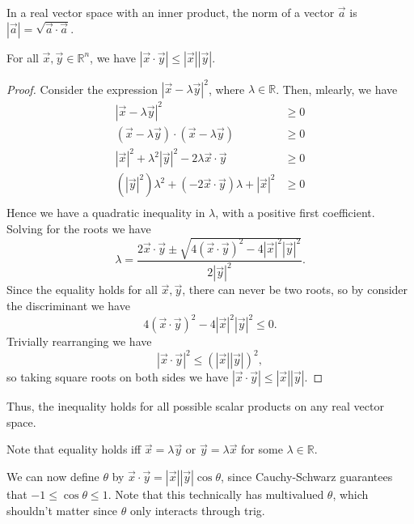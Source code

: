 \documentclass[12pt]{article}
\begin{document}
\begin{definition}
    In a real vector space with an inner product,
    the norm of a vector $\vec{a}$ is $|\vec{a}| = \sqrt{\vec{a}\cdot\vec{a}}$.
\end{definition}

\begin{theorem}
    For all $\vec{x},\vec{y} \in \mathbb{R}^{n}$, we have $|\vec{x}\cdot \vec{y}| \le |\vec{x}||\vec{y}|$.
    \begin{proof}
        Consider the expression $|\vec{x} - \lambda \vec{y}|^{2}$, where $\lambda \in \mathbb{R}$.
        Then, mlearly, we have
        \begin{align*}
            |\vec{x} - \lambda \vec{y}|^{2} &\ge 0 \\
            (\vec{x} - \lambda \vec{y})\cdot(\vec{x} - \lambda \vec{y}) &\ge 0\\
            |\vec{x}|^{2} + \lambda^{2}|\vec{y}|^{2} - 2\lambda \vec{x}\cdot\vec{y} &\ge 0\\
            (|\vec{y}|^{2})\lambda ^{2} + (-2\vec{x}\cdot\vec{y})\lambda + |\vec{x}|^{2} & \ge 0\\
        \end{align*}
        Hence we have a quadratic inequality in $\lambda $, with a positive first coefficient.
        Solving for the roots we have
        \[
        \lambda = \frac{2\vec{x}\cdot\vec{y} \pm \sqrt{4(\vec{x}\cdot\vec{y})^{2} - 
        4|\vec{x}|^{2}|\vec{y}|^{2}}}
        {2|\vec{y}|^{2}}.
        \]
        Since the equality holds for all $\vec{x},\vec{y}$, there can
        never be two roots, so by consider the discriminant we have
        \[
        4(\vec{x}\cdot\vec{y})^{2} - 4|\vec{x}|^{2}|\vec{y}|^{2} \le 0.
        \]
        Trivially rearranging we have
        \[
        |\vec{x}\cdot\vec{y}|^{2} \le \left(|\vec{x}||\vec{y}|\right)^{2},
        \]
        so taking square roots on both sides we have $|\vec{x}\cdot\vec{y}| \le |\vec{x}||\vec{y}|$.
    \end{proof}
\end{theorem}
Thus, the inequality holds for all possible scalar products
on any real vector space.

Note that equality holds iff $\vec{x} = \lambda \vec{y}$ or 
$\vec{y} = \lambda \vec{x}$ for some $\lambda  \in \mathbb{R}$.

We can now define $\theta $ by $\vec{x}\cdot\vec{y} = |\vec{x}||\vec{y}|\cos\theta $,
since Cauchy-Schwarz guarantees that $-1 \le \cos\theta \le 1$.
Note that this technically has multivalued $\theta $,
which shouldn't matter since $\theta $ only interacts through trig.
\end{document}
